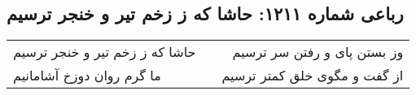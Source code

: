 \begin{center}
\section*{رباعی شماره ۱۲۱۱: حاشا که ز زخم تیر و خنجر ترسیم}
\label{sec:1211}
\begin{longtable}{l p{0.5cm} r}
حاشا که ز زخم تیر و خنجر ترسیم
&&
وز بستن پای و رفتن سر ترسیم
\\
ما گرم روان دوزخ آشامانیم
&&
از گفت و مگوی خلق کمتر ترسیم
\\
\end{longtable}
\end{center}
